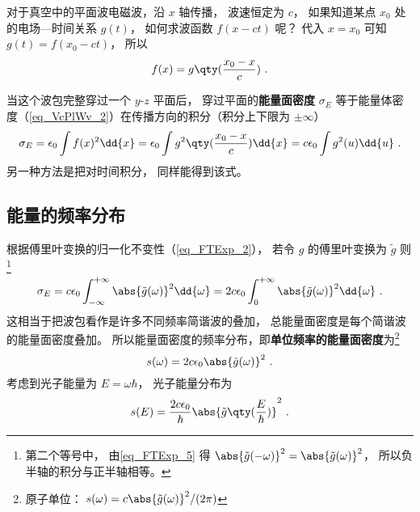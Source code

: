 

对于真空中的平面波电磁波，沿 $x$ 轴传播， 波速恒定为 $c$， 如果知道某点 $x_0$ 处的电场—时间关系 $g(t)$， 如何求波函数 $f(x - ct)$ 呢？ 代入 $x = x_0$ 可知 $g(t) = f(x_0 - ct)$， 所以
\begin{equation}
f(x) = g\qty(\frac{x_0 - x}{c})~.
\end{equation}

当这个波包完整穿过一个 $y$-$z$ 平面后， 穿过平面的\textbf{能量面密度} $\sigma_E$ 等于能量体密度（\autoref{eq_VcPlWv_2}）在传播方向的积分（积分上下限为 $\pm\infty$）
\begin{equation}\label{eq_WpEng_1}
\sigma_E = \epsilon_0 \int f(x)^2 \dd{x} = \epsilon_0  \int g^2\qty(\frac{x_0 - x}{c}) \dd{x} = c\epsilon_0 \int g^2(u) \dd{u}~.
\end{equation}
另一种方法是把对时间积分， 同样能得到该式。

\subsection{能量的频率分布}
根据傅里叶变换的归一化不变性（\autoref{eq_FTExp_2}）， 若令 $g$ 的傅里叶变换为 $\tilde g$ 则\footnote{第二个等号中， 由\autoref{eq_FTExp_5} 得 $\abs{\tilde g(-\omega)}^2 = \abs{\tilde g(\omega)}^2$， 所以负半轴的积分与正半轴相等。}
\begin{equation}
\sigma_E = c\epsilon_0 \int_{-\infty}^{+\infty} \abs{\tilde g(\omega)}^2 \dd{\omega} = 2c\epsilon_0 \int_{0}^{+\infty} \abs{\tilde g(\omega)}^2 \dd{\omega}~.
\end{equation}
这相当于把波包看作是许多不同频率简谐波的叠加， 总能量面密度是每个简谐波的能量面密度叠加。 所以能量面密度的频率分布，即\textbf{单位频率的能量面密度}为\footnote{原子单位： $s(\omega) = c \abs{\tilde g(\omega)}^2/(2\pi)$}
\begin{equation}\label{eq_WpEng_3}
s(\omega) = 2c\epsilon_0 \abs{\tilde g(\omega)}^2~.
\end{equation}
考虑到光子能量为 $E = \omega\hbar$， 光子能量分布为
\begin{equation}\label{eq_WpEng_2}
s(E) = \frac{2c\epsilon_0}{\hbar} \abs{\tilde g\qty(\frac{E}{\hbar})}^2~.
\end{equation}


